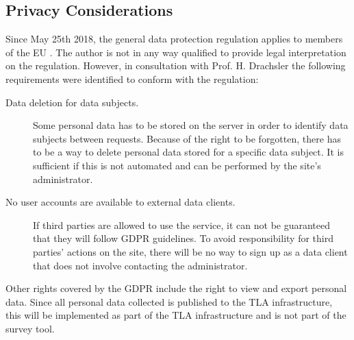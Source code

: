 \subsection{Privacy Considerations}
 Since May 25th 2018, the general data protection regulation applies to members of the EU \cite{gdpr-info}.
 The author is not in any way qualified to provide legal interpretation on the regulation.
 However, in consultation with Prof. H. Drachsler the following requirements
 were identified to conform with the regulation:

 \begin{description}
     \item[Data deletion for data subjects.] Some personal data has to be stored
     on the server in order to identify data subjects between requests. Because of the
     right to be forgotten, there has to be a way to delete personal data stored for
     a specific data subject. It is sufficient if this is not automated and can be performed
     by the site's administrator.
     \item[No user accounts are available to external data clients.] If third parties are allowed to use
     the service, it can not be guaranteed that they will follow GDPR guidelines.
     To avoid responsibility for third parties' actions on the site, there will
     be no way to sign up as a data client that does not involve contacting the administrator.
 \end{description}
 
 Other rights covered by the GDPR include the right to view and export personal data.
 Since all personal data collected is published to the TLA infrastructure,
 this will be implemented as part of the TLA infrastructure and is not
 part of the survey tool.

